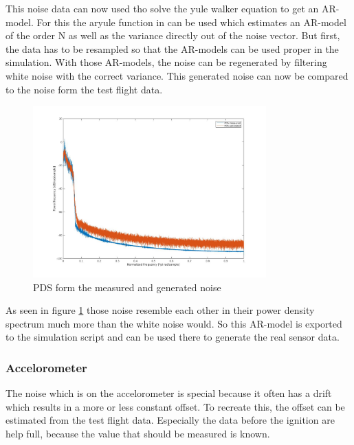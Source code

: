 This noise data can now used tho solve the yule walker equation to get an AR-model.
For this the aryule function in can be used which estimates an AR-model of the order N as well as the variance directly out of the noise vector.
But first, the data has to be resampled so that the AR-models can be used proper in the simulation.
With those AR-models, the noise can be regenerated by filtering white noise with the correct variance.
This generated noise can now be compared to the noise form the test flight data.

\begin{figure}[h!]
 \centering
 \includegraphics[width=0.8\textwidth]{./Pictures/PDSnoise.jpg}
 \caption{PDS form the measured and generated noise}
 \label{fig:PDSNoise}
\end{figure}


As seen in figure \ref{fig:PDSNoise} those noise resemble each other in their power density spectrum much more than the white noise would.
So this AR-model is exported to the simulation script and can be used there to generate the real sensor data.

\subsubsection{Accelorometer}
The noise which is on the accelorometer is special because it often has a drift which results in a more or less constant offset.
To recreate this, the offset can be estimated from the test flight data.
Especially the data before the ignition are help full, because the value that should be measured is known.

